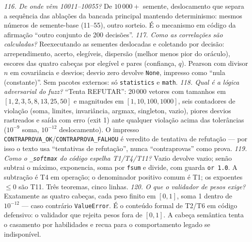 \textit{116. De onde vêm 10011--10055?} De $10\,000+$ semente, deslocamento que separa a sequência das ablações da bancada principal mantendo determinismo: mesmos números de semente-base (11--55), outro sorteio. É o mecanismo em código da afirmação ``outro conjunto de 200 decisões''.
\textit{117. Como as correlações são calculadas?} Reexecutando as sementes deslocadas e coletando por decisão: arrependimento, acerto, elegíveis, dispersão (melhor menos pior do oráculo), escores das quatro cabeças por elegível e pares (confiança, $q$). Pearson com divisor $n$ em covariância e desvios; desvio zero devolve \texttt{None}, impresso como ``nula (constante)''. Sem pacotes externos: só \texttt{statistics} e \texttt{math}.
\textit{118. Qual é a lógica adversarial do fuzz?} ``Tenta REFUTAR'': 20\,000 vetores com tamanhos em $[1,2,3,5,8,13,25,50]$ e magnitudes em $[1,10,100,1000]$, seis contadores de violação (soma, limites, invariância, argmax, singleton, vazio), piores desvios rastreados e saída com erro (exit 1) ante qualquer violação acima das tolerâncias ($10^{-9}$ soma, $10^{-12}$ deslocamento). O impresso \texttt{CONTRAPROVA\_OK}/\texttt{CONTRAPROVA\_FALHOU} é veredito de tentativa de refutação --- por isso o texto usa ``tentativas de refutação'', nunca ``contraprovas'' como prova.
\textit{119. Como o \texttt{\_softmax} do código espelha T1/T4/T11?} Vazio devolve vazio; senão subtrai o máximo, exponencia, soma por \texttt{fsum} e divide, com guarda \texttt{or 1.0}. A subtração é T4 em operação; o denominador positivo comum é T1; os expoentes $\leq0$ são T11. Três teoremas, cinco linhas.
\textit{120. O que o validador de pesos exige?} Exatamente as quatro cabeças, cada peso finito em $[0,1]$, soma 1 dentro de $10^{-12}$ --- caso contrário \texttt{ValueError}. É o conteúdo formal de T2/T6 em código defensivo: o validador que rejeita pesos fora de $[0,1]$. A cabeça semântica tenta o casamento por habilidades e recua para o comportamento legado se indisponível.
